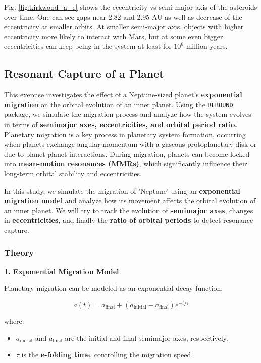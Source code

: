 \documentclass[12pt,a4paper]{article}
\begin{document}
Fig. \ref{fig:kirkwood_a_e} shows the eccentricity vs semi-major axis of the asteroids over time. One can see gaps near 2.82 and 2.95 AU as well as decrease of the eccentricity at smaller orbits.
At smaller semi-major axis, objects with higher eccentricity more likely to interact with Mars, but at some even bigger eccentricities can keep being in the system at least for $10^6$ million years.

\subsection{Resonant Capture of a Planet}
This exercise investigates the effect of a Neptune-sized planet's \textbf{exponential migration} on the orbital evolution of an inner planet. Using the \texttt{REBOUND} package, we simulate the migration process and analyze how the system evolves in terms of \textbf{semimajor axes, eccentricities, and orbital period ratio.}
\\ Planetary migration is a key process in planetary system formation, occurring when planets exchange angular momentum with a gaseous protoplanetary disk or due to planet-planet interactions. During migration, planets can become locked into \textbf{mean-motion resonances (MMRs)}, which significantly influence their long-term orbital stability and eccentricities.

In this study, we simulate the migration of 'Neptune' using an \textbf{exponential migration model} and analyze how its movement affects the orbital evolution of an inner planet. We will try to track the evolution of \textbf{semimajor axes}, changes in \textbf{eccentricities}, and finally the \textbf{ratio of orbital periods} to detect resonance capture.

\subsubsection{Theory}

\textbf{1. Exponential Migration Model}

Planetary migration can be modeled as an exponential decay function:

\begin{equation}
    a(t) = a_{\text{final}} + (a_{\text{initial}} - a_{\text{final}}) e^{-t/\tau}
\end{equation}

where:
\begin{itemize}
    \item \( a_{\text{initial}} \) and \( a_{\text{final}} \) are the initial and final semimajor axes, respectively.
    \item \( \tau \) is the \textbf{e-folding time}, controlling the migration speed.
\end{itemize}
\end{document}
